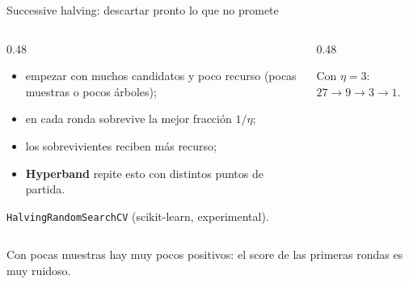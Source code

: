 \documentclass[aspectratio=169,12pt]{beamer}
\begin{document}
\begin{frame}{Successive halving: descartar pronto lo que no promete}
  \begin{columns}[T]
    \begin{column}{0.48\textwidth}
      \footnotesize
      \begin{itemize}
        \item empezar con muchos candidatos y poco recurso (pocas muestras o pocos árboles);
        \item en cada ronda sobrevive la mejor fracción $1/\eta$;
        \item los sobrevivientes reciben más recurso;
        \item \textbf{Hyperband} repite esto con distintos puntos de partida.
      \end{itemize}
      \footnotesize\texttt{HalvingRandomSearchCV} (scikit-learn, experimental).
    \end{column}
    \begin{column}{0.48\textwidth}
      \centering
      \par\footnotesize Con $\eta = 3$: $27 \rightarrow 9 \rightarrow 3 \rightarrow 1$.
    \end{column}
  \end{columns}
  \begin{rulebox}
    \footnotesize Con pocas muestras hay muy pocos positivos: el score de las primeras rondas es muy ruidoso.
  \end{rulebox}
\end{frame}
\end{document}
